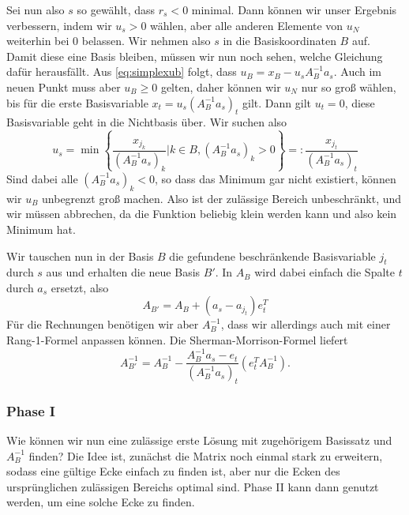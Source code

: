Sei nun also $s$ so gewählt, dass $r_s< 0$ minimal. Dann können wir
unser Ergebnis verbessern, indem wir $u_s>0$ wählen, aber alle
anderen Elemente von $u_N$ weiterhin bei 0 belassen. Wir nehmen also
$s$ in die Basiskoordinaten $B$ auf. Damit diese eine Basis bleiben,
müssen wir nun noch sehen, welche Gleichung dafür herausfällt. Aus
\eqref{eq:simplexub} folgt, dass $u_B = x_B - u_s A_B^{-1}a_s$.  Auch
im neuen Punkt muss aber $u_B\ge 0$ gelten, daher können wir $u_N$ nur
so groß wählen, bis für die erste Basisvariable $x_t= u_s
(A_B^{-1}a_s)_t$ gilt. Dann gilt $u_t=0$, \dh diese Basisvariable
geht in die Nichtbasis über.
Wir suchen also
\begin{equation}
  u_s = \min \left\{\frac{x_{j_k}}{(A_B^{-1}a_s)_k} | k\in B,
      (A_B^{-1}a_s)_k > 0\right\} =:
  \frac{x_{j_t}}{(A_B^{-1}a_s)_t}
\end{equation}
Sind dabei alle $(A_B^{-1}a_s)_k < 0$, so dass das Minimum gar nicht
existiert, können wir $u_B$ unbegrenzt groß machen. Also ist der
zulässige Bereich unbeschränkt, und wir müssen abbrechen, da die
Funktion beliebig klein werden kann und also kein Minimum hat.

Wir tauschen nun in der Basis $B$ die gefundene beschränkende
Basisvariable  $j_t$ durch $s$ aus und erhalten die
neue Basis $B'$. In $A_B$ wird dabei einfach die Spalte $t$ durch
$a_s$ ersetzt, also
\begin{equation}
  A_{B'} = A_B + (a_s - a_{j_t})e_t^T
\end{equation}
Für die Rechnungen benötigen wir aber $A_B^{-1}$, dass wir allerdings
auch mit einer Rang-1-Formel anpassen können. Die
Sherman-Morrison-Formel liefert
\begin{equation}
  \label{eq:simplexex}
  A_{B'}^{-1} = A_{B}^{-1} - \frac{A_B^{-1}a_s - e_t}{(A_B^{-1}a_s)_t}
  \left(e_t^TA_{B}^{-1}\right).
\end{equation}

\subsubsection*{Phase I}

Wie können wir nun eine zulässige erste Lösung mit zugehörigem
Basissatz und $A_B^{-1}$ finden? Die Idee ist, zunächst die Matrix
noch einmal stark zu erweitern, sodass eine gültige Ecke einfach zu
finden ist, aber nur die Ecken des ursprünglichen zulässigen Bereichs
optimal sind. Phase II kann dann genutzt werden, um eine solche Ecke zu finden.

